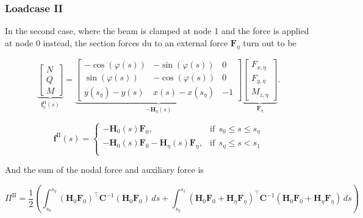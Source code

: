 \subsubsection*{Loadcase II}

In the second case, where the beam is clamped at node 1 and the force is applied at node 0 instead, the section forces du to an external force $\boldsymbol{F}_\eta$ turn out to be

\begin{equation}
\underbrace{
\begin{bmatrix}
N \\ Q \\ M
\end{bmatrix}
}_{\boldsymbol{f}^{\mathrm{II}}_{\eta}(s)}
=
\underbrace{
\begin{bmatrix}
-\cos(\varphi(s)) & -\sin(\varphi(s)) & 0 \\
\sin(\varphi(s)) & -\cos(\varphi(s)) & 0 \\
y(s_\eta) - y(s) & x(s) - x(s_\eta) & -1
\end{bmatrix}
}_{-\boldsymbol{H}_{\eta}(s)}
\underbrace{
\begin{bmatrix}
F_{x,\eta} \\ F_{y,\eta} \\ M_{z,\eta}
\end{bmatrix}
}_{\boldsymbol{F}_\eta}. \label{eq:section-static-equilibrium}
\end{equation}

\begin{equation}
\boldsymbol{f}^{\mathrm{II}}(s) = \begin{cases}
-\boldsymbol{H}_{0}(s)\boldsymbol{F}_0, & \text{if}\ \ s_0 \le s \le s_\eta \\
-\boldsymbol{H}_{0}(s)\boldsymbol{F}_0 - \boldsymbol{H}_{\eta}(s)\boldsymbol{F}_\eta, & \text{if}\ \ s_\eta \le s < s_1 \\
\end{cases}
\end{equation}

And the sum of the nodal force and auxiliary force is

\begin{equation}
\Pi^{\mathrm{II}} = \frac{1}{2}\left(\int_{s_0}^{s_\eta} \left(\boldsymbol{H}_{0}\boldsymbol{F}_0\right)^\intercal\boldsymbol{C}^{-1}\left(\boldsymbol{H}_{0}\boldsymbol{F}_0\right)\,ds + \int_{s_\eta}^{s_1} \left(\boldsymbol{H}_{0}\boldsymbol{F}_0 + \boldsymbol{H}_{\eta}\boldsymbol{F}_\eta\right)^\intercal\boldsymbol{C}^{-1}\left(\boldsymbol{H}_{0}\boldsymbol{F}_0 + \boldsymbol{H}_{\eta}\boldsymbol{F}_\eta\right)\,ds\right)
\end{equation}

